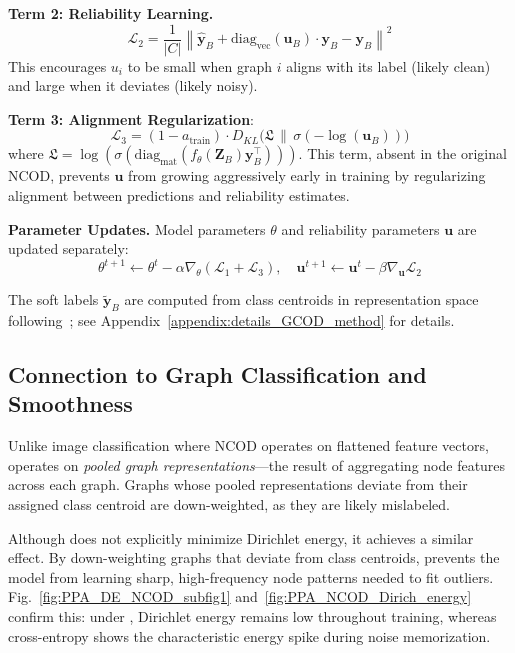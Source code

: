 \textbf{Term 2: Reliability Learning.}
\begin{equation}
\label{eq:gcod2}
\mathcal{L}_2 = \frac{1}{|C|} \left\| \mathbf{\hat{y}}_B + \text{diag}_\text{vec}(\mathbf{u}_B) \cdot \mathbf{y}_B - \mathbf{y}_B \right\|^2
\end{equation}
This encourages $u_i$ to be small when graph $i$ aligns with its label (likely clean) and large when it deviates (likely noisy).

\textbf{Term 3: Alignment Regularization}:
\begin{equation}
\label{eq:gcod3}
\mathcal{L}_3 = (1 - a_{\text{train}}) \cdot D_{KL}\big(\mathfrak{L} \,\|\, \sigma(-\log(\mathbf{u}_B))\big)
\end{equation}
where $\mathfrak{L} = \log(\sigma(\text{diag}_\text{mat}(f_{\theta}(\mathbf{Z}_B)\mathbf{y}_B^\top)))$. This term, absent in the original NCOD, prevents $\mathbf{u}$ from growing aggressively early in training by regularizing alignment between predictions and reliability estimates.

\textbf{Parameter Updates.} Model parameters $\theta$ and reliability parameters $\mathbf{u}$ are updated separately:
\begin{equation}
\label{eq:gcod_update}
\theta^{t+1} \leftarrow \theta^t - \alpha \nabla_\theta (\mathcal{L}_1 + \mathcal{L}_3), \quad
\mathbf{u}^{t+1} \leftarrow \mathbf{u}^t - \beta \nabla_{\mathbf{u}} \mathcal{L}_2
\end{equation}

The soft labels $\mathbf{\tilde{y}}_B$ are computed from class centroids in representation space following~\cite{wani2023combining}; see Appendix~\ref{appendix:details_GCOD_method} for details.

\subsection{Connection to Graph Classification and Smoothness}

Unlike image classification where NCOD operates on flattened feature vectors, \method operates on \emph{pooled graph representations}---the result of aggregating node features across each graph. Graphs whose pooled representations deviate from their assigned class centroid are down-weighted, as they are likely mislabeled.

Although \method does not explicitly minimize Dirichlet energy, it achieves a similar effect. By down-weighting graphs that deviate from class centroids, \method prevents the model from learning sharp, high-frequency node patterns needed to fit outliers. Fig.~\ref{fig:PPA_DE_NCOD_subfig1} and~\ref{fig:PPA_NCOD_Dirich_energy} confirm this: under \method, Dirichlet energy remains low throughout training, whereas cross-entropy shows the characteristic energy spike during noise memorization.

